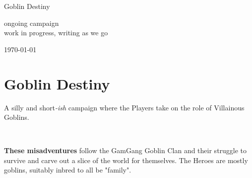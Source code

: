 







\pagestyle{empty}

\begin{center}
\huge
Goblin Destiny

\vspace{2cm}

\normalsize
ongoing campaign\\
work in progress, writing as we go\\

\vfill

\today

\end{center}






\cleardoublepage
\pagestyle{fancy}

\setcounter{page}{1}




\section*{Goblin Destiny}

A silly and short\emph{-ish} campaign where the Players take on the role of Villainous Goblins.

\

\textbf{These misadventures} follow the GamGang Goblin Clan and their struggle to survive and carve out a slice of the world for themselves. The Heroes are mostly goblins, suitably inbred to all be "family".

